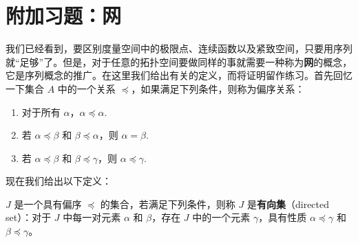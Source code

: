 \section*{附加习题：网}\label{section:ch03-extra-nets}

我们已经看到，要区别度量空间中的极限点、连续函数以及紧致空间，只要用序列就``足够''了。但是，对于任意的拓扑空间要做同样的事就需要一种称为\textbf{网}的概念，它是序列概念的推广。在这里我们给出有关的定义，而将证明留作练习。首先回忆一下集合 $A$ 中的一个关系 $\preceq$，如果满足下列条件，则称为偏序关系：
\begin{enumerate}
\item 对于所有 $\alpha$，$\alpha\preceq\alpha$.
\item 若 $\alpha\preceq\beta$ 和 $\beta\preceq\alpha$，则 $\alpha=\beta$.
\item 若 $\alpha\preceq\beta$ 和 $\beta\preceq\gamma$，则 $\alpha\preceq\gamma$.
\end{enumerate}

现在我们给出以下定义：

$J$ 是一个具有偏序 $\preceq$ 的集合，若满足下列条件，则称 $J$ 是\textbf{有向集}（directed set）：对于 $J$ 中每一对元素 $\alpha$ 和 $\beta$，存在 $J$ 中的一个元素 $\gamma$，具有性质 $\alpha\preceq\gamma$ 和 $\beta\preceq\gamma$。

